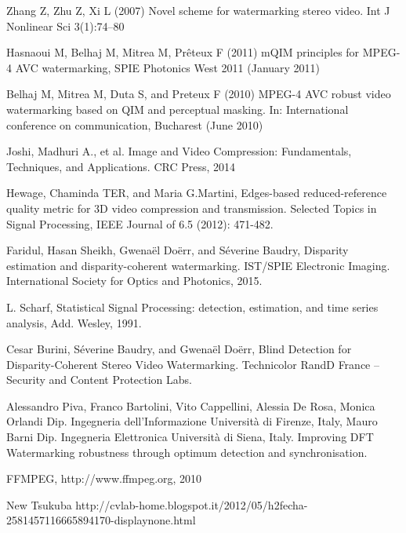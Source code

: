 \begin{thebibliography}{99}
Zhang Z, Zhu Z, Xi L (2007) Novel scheme for watermarking stereo video. Int J Nonlinear Sci 3(1):74–80

Hasnaoui M, Belhaj M, Mitrea M, Prêteux F (2011) mQIM principles for MPEG-4 AVC watermarking, SPIE Photonics West 2011 (January 2011)

Belhaj M, Mitrea M, Duta S, and Preteux F (2010) MPEG-4 AVC robust video watermarking based on QIM and perceptual masking. In: International conference on communication, Bucharest (June 2010)

Joshi, Madhuri A., et al. Image and Video Compression: Fundamentals, Techniques, and Applications. CRC Press, 2014

 Hewage, Chaminda TER, and Maria G.Martini, Edges-based reduced-reference quality metric for 3D video compression and transmission. Selected Topics in Signal Processing, IEEE Journal of 6.5 (2012): 471-482.



Faridul, Hasan Sheikh, Gwenaël Doërr, and Séverine Baudry, Disparity estimation and disparity-coherent watermarking. IST/SPIE Electronic Imaging. International Society for Optics and Photonics, 2015.


L. Scharf, Statistical Signal Processing: detection,
estimation, and time series analysis, Add. Wesley,
1991.


Cesar Burini, Séverine Baudry, and Gwenaël Doërr, Blind Detection for Disparity-Coherent Stereo Video Watermarking. Technicolor RandD France – Security and Content Protection Labs.

Alessandro Piva, Franco Bartolini, Vito Cappellini, Alessia De Rosa, Monica Orlandi Dip. Ingegneria dell’Informazione Università di Firenze, Italy,  Mauro Barni Dip. Ingegneria Elettronica Università di Siena, Italy. Improving DFT Watermarking robustness through optimum detection and synchronisation.

 FFMPEG, http://www.ffmpeg.org, 2010

New Tsukuba http://cvlab-home.blogspot.it/2012/05/h2fecha-2581457116665894170-displaynone.html



\end{thebibliography}
\clearpage
\thispagestyle{empty}